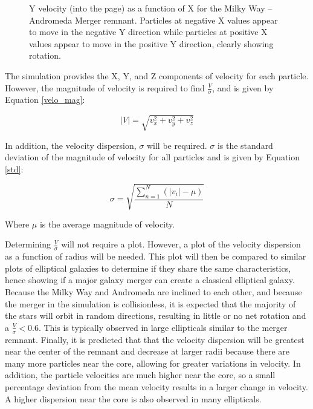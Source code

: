 \documentclass[twocolumn]{aastex63}
\begin{document}
\begin{figure}
    \centering
    \caption{Y velocity (into the page) as a function of X for the Milky Way -- Andromeda Merger remnant. Particles at negative X values appear to move in the negative Y direction while particles at positive X values appear to move in the positive Y direction, clearly showing rotation.}
    \label{velocity}
\end{figure}

The simulation provides the X, Y, and Z components of velocity for each particle. However, the magnitude of velocity is required to find $\frac{V}{\sigma}$, and is given by Equation \ref{velo_mag}:

\begin{equation}
    |V|=\sqrt{v_x^2 + v_y^2 + v_z^2}
    \label{velo_mag}
\end{equation}

In addition, the velocity dispersion, $\sigma$ will be required. $\sigma$ is the standard deviation of the magnitude of velocity for all particles and is given by Equation \ref{std}:

\begin{equation}
    \sigma=\sqrt{\frac{\sum\limits_{n=1}^{N} (|v_i|-\mu)}{N}}
    \label{std}
\end{equation}

Where $\mu$ is the average magnitude of velocity.

Determining $\frac{V}{\sigma}$ will not require a plot. However, a plot of the velocity dispersion as a function of radius will be needed. This plot will then be compared to similar plots of elliptical galaxies to determine if they share the same characteristics, hence showing if a major galaxy merger can create a classical elliptical galaxy.\\

Because the Milky Way and Andromeda are inclined to each other, and because the merger in the simulation is collisionless, it is expected that the majority of the stars will orbit in random directions, resulting in little or no net rotation and a $\frac{V}{\sigma}<0.6$. This is typically observed in large ellipticals similar to the merger remnant. Finally, it is predicted that that the velocity dispersion will be greatest near the center of the remnant and decrease at larger radii because there are many more particles near the core, allowing for greater variations in velocity. In addition, the particle velocities are much higher near the core, so a small percentage deviation from the mean velocity results in a larger change in velocity. A higher dispersion near the core is also observed in many ellipticals.

{}

\end{document}
